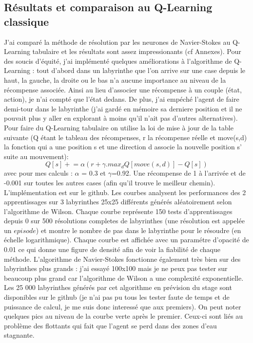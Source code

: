 \documentclass[10pt]{article}
\newcommand{\pluseq}{\mathrel{+}=}
\begin{document}
\subsection{Résultats et comparaison au Q-Learning classique}
J'ai comparé la méthode de résolution par les neurones de Navier-Stokes au Q-Learning tabulaire et les résultats sont assez impressionants (cf Annexes). Pour des soucis d'équité, j'ai implémenté quelques améliorations à l'algorithme de Q-Learning : tout d'abord dans un labyrinthe que l'on arrive sur une case depuis le haut, la gauche, la droite ou le bas n'a aucune importance au niveau de la récompense associée. Ainsi au lieu d'associer une récompense à un couple (état, action), je n'ai compté que l'état dedans. De plus, j'ai empéché l'agent de faire demi-tour dans le labyrinthe (j'ai gardé en mémoire sa derniere position et il ne pouvait plus y aller en explorant à moins qu'il n'ait pas d'autres alternatives). Pour faire du Q-Learning tabulaire on utilise la loi de mise à jour de la table suivante (Q étant le tableau des récompenses, r la récompense réelle et move(s,d) la fonction qui a une position s et une direction d associe la nouvelle position s' suite au mouvement):
\[Q[s] \pluseq \alpha(r+\gamma.max_dQ[move(s,d)]-Q[s])\]
avec pour mes calculs : $\alpha$ = 0.3 et $\gamma$=0.92. Une récompense de 1 à l'arrivée et de -0.001 sur toutes les autres cases (afin qu'il trouve le meilleur chemin). L'implémentation est sur le github.
Les courbes analysent les performances des 2 apprentissages sur 3 labyrinthes 25x25 différents générés aléatoirement selon l'algorithme de Wilson. Chaque courbe représente 150 tests d'apprentissages depuis 0 sur 500 résolutions completes de labyrinthes (une résolution est appelée un $\textit{episode}$) et montre le nombre de pas dans le labyrinthe pour le résoudre (en échelle logarithmique). Chaque courbe est affichée avec un paramétre d'opacité de 0.01 ce qui donne une figure de densité afin de voir la fiabilité de chaque méthode.
L'algorithme de Navier-Stokes fonctionne également très bien sur des labyrinthes plus grands : j'ai essayé 100x100 mais je ne peux pas tester sur beaucoup plus grand car l'algorithme de Wilson a une complexité exponentielle. Les 25 000 labyrinthes générés par cet algorithme en prévision du stage sont disponibles sur le github (je n'ai pas pu tous les tester faute de temps et de puissance de calcul, je me suis donc interessé que aux premiers).
On peut noter quelques pics au niveau de la courbe verte après le premier. Ceux-ci sont liés au problème des flottants qui fait que l'agent se perd dans des zones d'eau stagnante.
\end{document}
